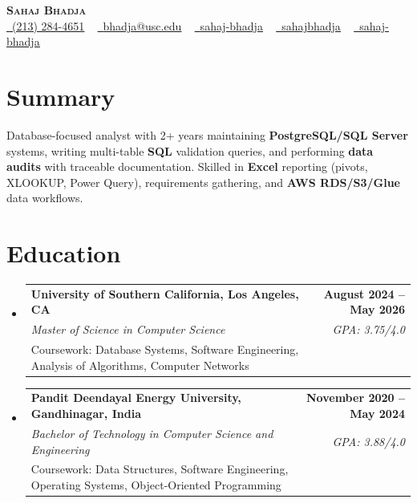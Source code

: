 \documentclass[letterpaper,10pt]{article}
\makeatletter
\newcommand{\resumeEduSubheading}[5]{\vspace{-1pt}\item\begin{tabular*}{1.0\textwidth}[t]{l@{\extracolsep{\fill}}r}\textbf{#1} & \textbf{\small #2} \\\textit{\small #3} & \textit{\small #4} \\\small #5 & \\\end{tabular*}\vspace{-4pt}}
\newcommand{\resumeSubHeadingListStart}{\begin{itemize}[leftmargin=0.0in, label={}]}
\newcommand{\resumeSubHeadingListEnd}{\end{itemize}}
\makeatother
\begin{document}
\begin{center}
{\Huge \scshape \textbf{Sahaj Bhadja}} \\ \vspace{1pt}
\small \href{tel:(213) 284-4651}{\faPhone\ \underline{(213) 284-4651}} ~ \href{mailto:bhadja@usc.edu}{\raisebox{-0.2\height}\faEnvelope\ \underline{bhadja@usc.edu}} ~
\href{https://www.linkedin.com/in/sahaj-bhadja/}{\raisebox{-0.2\height}\faLinkedin\ \underline{sahaj-bhadja}} ~ \href{https://github.com/SAHAJ-BHADJA}{\raisebox{-0.2\height}\faGithub\ \underline{sahajbhadja}} ~
\href{https://sahaj-bhadja.vercel.app/}{\raisebox{-0.2\height}\faGlobe\ \underline{sahaj-bhadja}}
\end{center}
\vspace{-18pt}
\section{Summary}
\begin{itemize}[leftmargin=0.15in, label={}]
\small{\item{Database-focused analyst with 2+ years maintaining \textbf{PostgreSQL/SQL Server} systems, writing multi-table \textbf{SQL} validation queries, and performing \textbf{data audits} with traceable documentation. Skilled in \textbf{Excel} reporting (pivots, XLOOKUP, Power Query), requirements gathering, and \textbf{AWS RDS/S3/Glue} data workflows.}}
\end{itemize}
\vspace{-16pt}
\section{Education}
\resumeSubHeadingListStart
\resumeEduSubheading{University of Southern California, Los Angeles, CA}{August 2024 -- May 2026}{Master of Science in Computer Science}{GPA: 3.75/4.0}{Coursework: Database Systems, Software Engineering, Analysis of Algorithms, Computer Networks}
\vspace{-9pt}
\resumeEduSubheading{Pandit Deendayal Energy University, Gandhinagar, India}{November 2020 -- May 2024}{Bachelor of Technology in Computer Science and Engineering}{GPA: 3.88/4.0}{Coursework: Data Structures, Software Engineering, Operating Systems, Object-Oriented Programming}
\resumeSubHeadingListEnd
\vspace{-14pt}
\end{document}
